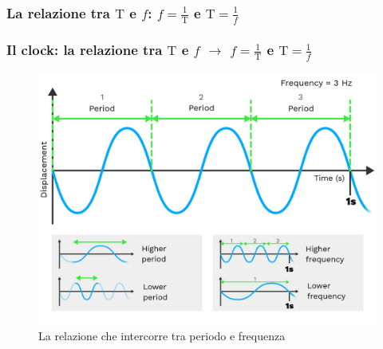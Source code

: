 \subsubsection[La relazione tra $\mathrm{T}$ e $f$: $f = \frac{1}{\mathrm{T}}$ e $\mathrm{T} = \frac{1}{f}$]{La relazione tra $\mathrm{T}$ e $f$: $f = \frac{1}{\mathrm{T}}$ e $\mathrm{T} = \frac{1}{f}$}
\begin{frame}
	\frametitle{Il clock: la relazione tra $\mathrm{T}$ e $f$ $\rightarrow$ $f = \frac{1}{\mathrm{T}}$ e $\mathrm{T} = \frac{1}{f}$}
		
	\begin{figure}[!htbp]
		\centering 
		\includegraphics[width=0.82\linewidth]{images/2_le_architetture/period_frequency.png}
		\caption{La relazione che intercorre tra periodo e frequenza}
		\label{fig:architectures_period_frequency}
	\end{figure}
\end{frame}


